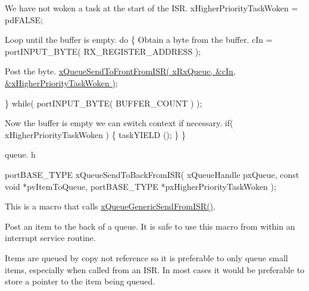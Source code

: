 \begin{DoxyPre}We have not woken a task at the start of the ISR.
    xHigherPriorityTaskWoken = pdFALSE;\end{DoxyPre}



\begin{DoxyPre}Loop until the buffer is empty.
    do
    \{
Obtain a byte from the buffer.
        cIn = portINPUT\_BYTE( RX\_REGISTER\_ADDRESS );\end{DoxyPre}



\begin{DoxyPre}Post the byte.
        \hyperlink{queue_8h_a849dd669e72bfb12314f4445157c9a04}{xQueueSendToFrontFromISR( xRxQueue, &cIn, &xHigherPriorityTaskWoken )};\end{DoxyPre}



\begin{DoxyPre}    \} while( portINPUT\_BYTE( BUFFER\_COUNT ) );\end{DoxyPre}



\begin{DoxyPre}Now the buffer is empty we can switch context if necessary.
    if( xHigherPriorityTaskWoken )
    \{
        taskYIELD ();
    \}
 \}
 \end{DoxyPre}


queue. h 
\begin{DoxyPre}
 portBASE\_TYPE xQueueSendToBackFromISR(
                                         xQueueHandle pxQueue,
                                         const void *pvItemToQueue,
                                         portBASE\_TYPE *pxHigherPriorityTaskWoken
                                      );
 \end{DoxyPre}


This is a macro that calls \hyperlink{queue_8c_a6cf5fbaaec7bad15c9dfba98972e6888}{x\-Queue\-Generic\-Send\-From\-I\-S\-R()}.

Post an item to the back of a queue. It is safe to use this macro from within an interrupt service routine.

Items are queued by copy not reference so it is preferable to only queue small items, especially when called from an I\-S\-R. In most cases it would be preferable to store a pointer to the item being queued.


